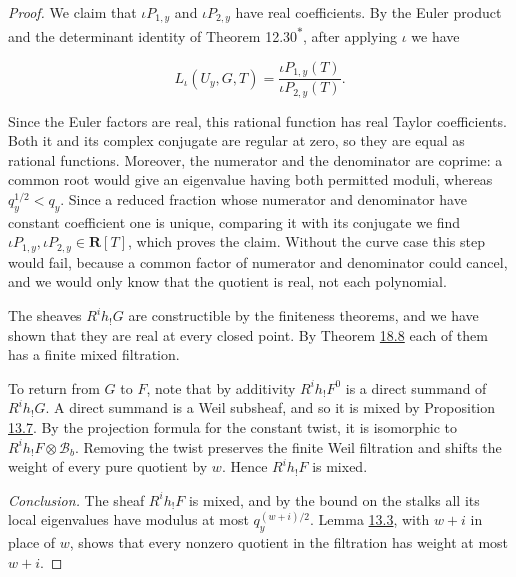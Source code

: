 \documentclass[11pt]{article}
\newcommand{\bpout}[1]{#1\textsuperscript{\hyperlink{bp-outside}{\ensuremath{\ast}}}}
\begin{document}
\begin{proof}[{Proof}]
We claim that \(\iota P_{1,y}\) and \(\iota P_{2,y}\) have real coefficients. By the Euler product and the determinant identity of Theorem \bpout{12.30}, after applying \(\iota\) we have

\[
L_\iota(U_y,G,T)=\frac{\iota P_{1,y}(T)}{\iota P_{2,y}(T)}.
\]

Since the Euler factors are real, this rational function has real Taylor coefficients. Both it and its complex conjugate are regular at zero, so they are equal as rational functions. Moreover, the numerator and the denominator are coprime: a common root would give an eigenvalue having both permitted moduli, whereas \(q_y^{1/2}<q_y\). Since a reduced fraction whose numerator and denominator have constant coefficient one is unique, comparing it with its conjugate we find \(\iota P_{1,y},\iota P_{2,y}\in\mathbf R[T]\), which proves the claim. Without the curve case this step would fail, because a common factor of numerator and denominator could cancel, and we would only know that the quotient is real, not each polynomial.

The sheaves \(R^ih_!G\) are constructible by the finiteness theorems, and we have shown that they are real at every closed point. By Theorem \hyperref[bp295]{18.8} each of them has a finite mixed filtration.

To return from \(G\) to \(F\), note that by additivity \(R^ih_!F^0\) is a direct summand of \(R^ih_!G\). A direct summand is a Weil subsheaf, and so it is mixed by Proposition \hyperref[bp24]{13.7}. By the projection formula for the constant twist, it is isomorphic to \(R^ih_!F\otimes\mathcal B_b\). Removing the twist preserves the finite Weil filtration and shifts the weight of every pure quotient by \(w\). Hence \(R^ih_!F\) is mixed.

\emph{Conclusion.} The sheaf \(R^ih_!F\) is mixed, and by the bound on the stalks all its local eigenvalues have modulus at most \(q_y^{(w+i)/2}\). Lemma \hyperref[bp14]{13.3}, with \(w+i\) in place of \(w\), shows that every nonzero quotient in the filtration has weight at most \(w+i\).
\end{proof}


\end{document}
